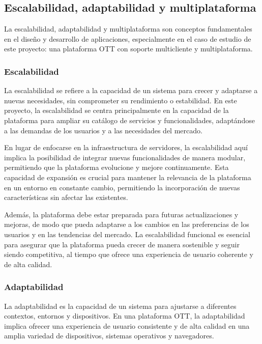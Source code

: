 \subsection{Escalabilidad, adaptabilidad y multiplataforma}
\label{sec:fundamentos_teoricos_esc_adapt}

La escalabilidad, adaptabilidad y multiplataforma son conceptos fundamentales en el diseño y desarrollo de 
aplicaciones, especialmente en el caso de estudio de este proyecto: una plataforma OTT con soporte multicliente 
y multiplataforma.

\subsubsection{Escalabilidad}
\label{subsec:fundamentos_teoricos_esc_adapt_escalabilidad}

La escalabilidad se refiere a la capacidad de un sistema para crecer y adaptarse a nuevas necesidades, sin 
comprometer su rendimiento o estabilidad. En este proyecto, la escalabilidad se centra principalmente en la 
capacidad de la plataforma para ampliar su catálogo de servicios y funcionalidades, adaptándose a las demandas 
de los usuarios y a las necesidades del mercado.

En lugar de enfocarse en la infraestructura de servidores, la escalabilidad aquí implica la posibilidad de 
integrar nuevas funcionalidades de manera modular, permitiendo que la plataforma evolucione y mejore continuamente. 
Esta capacidad de expansión es crucial para mantener la relevancia de la plataforma en un entorno en constante 
cambio, permitiendo la incorporación de nuevas características sin afectar las existentes.

Además, la plataforma debe estar preparada para futuras actualizaciones y mejoras, de modo que pueda adaptarse 
a los cambios en las preferencias de los usuarios y en las tendencias del mercado. La escalabilidad funcional 
es esencial para asegurar que la plataforma pueda crecer de manera sostenible y seguir siendo competitiva, al 
tiempo que ofrece una experiencia de usuario coherente y de alta calidad.


\subsubsection{Adaptabilidad}
\label{subsec:fundamentos_teoricos_esc_adapt_adaptabilidad}

La adaptabilidad es la capacidad de un sistema para ajustarse a diferentes contextos, entornos y dispositivos. 
En una plataforma OTT, la adaptabilidad implica ofrecer una experiencia de usuario consistente y de alta calidad 
en una amplia variedad de dispositivos, sistemas operativos y navegadores.

